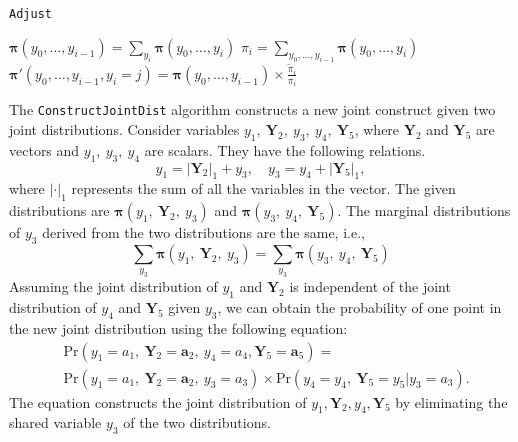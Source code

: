 \documentclass[a4paper,review,12pt,authoryear]{elsarticle}
\let\code=\texttt
\newcommand{\bY}{\mathbf{Y}}
\newcommand{\bpi}{\bm{\pi}}
\theoremstyle{definition}
\begin{document}
\begin{algorithm}[H]
  \label{alg:adjust}
  \caption{\code{Adjust}}
  \Input{$\bpi(y_0,y_1,\dots,y_i), \tilde\pi_i, y_i \in \{0,1,\dots,k_i\}$}

  $\bpi(y_0,\dots,y_{i-1}) = \sum_{y_i}\bpi(y_0,\dots,y_i)$\;
  $\pi_i = \sum_{y_0,\dots,y_{i-1}}\bpi(y_0,\dots,y_i)$ \;
   {
    $\bpi'(y_0,\dots,y_{i-1}, y_i=j) = \bpi(y_0,\dots,y_{i-1}) \times \frac{\tilde\pi_i}{\pi_i}$ \;
  }

  \Output{$\bpi'(y_0,\dots,y_i)$}

 \end{algorithm}


 The \code{ConstructJointDist} algorithm constructs a new joint construct given two joint distributions.
 Consider variables $y_1, ~ \bY_2, ~ y_3, ~ y_4, ~ \bY_5$, where $\bY_2$ and $\bY_5$ are vectors and $y_1, ~ y_3, ~ y_4$ are scalars.
 They have the following relations.
 \[
  y_1 = |\bY_2|_1 + y_3, \quad y_3 = y_4 + |\bY_5|_1,
 \]
 where $|\cdot|_1$ represents the sum of all the variables in the vector.
 The given distributions are $\bpi(y_1, ~ \bY_2, ~ y_3)$ and $\bpi(y_3, ~ y_4, ~ \bY_5)$.
 The marginal distributions of $y_3$ derived from the two distributions are the same, i.e.,
 \[
  \sum_{y_3} \bpi(y_1, ~ \bY_2, ~ y_3) = \sum_{y_3}\bpi(y_3, ~ y_4, ~ \bY_5)
\]
 Assuming the joint distribution of $y_1$ and $\bY_2$ is independent of the joint distribution of $y_4$ and $\bY_5$ given $y_3$, we can obtain the probability of one point in the new joint distribution using the following equation: \[
   \begin{aligned}
  &\text{Pr}(y_1=a_1, ~ \bY_2=\mathbf{a}_2, ~ y_4=a_4, \bY_5 = \mathbf{a}_5) =\\ &\text{Pr} (y_1=a_1, ~ \bY_2=\mathbf{a}_2, ~ y_3=a_3) \times \text{Pr}(y_4=y_4, ~ \bY_5=y_5|y_3=a_3).
   \end{aligned}
 \]
 The equation constructs the joint distribution of $y_1, \bY_2, y_4, \bY_5$ by eliminating the shared variable $y_3$ of the two distributions.
\end{document}
